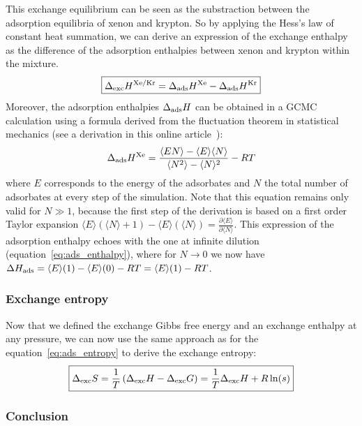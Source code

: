 \documentclass[main.tex]{subfiles}
\begin{document}
This exchange equilibrium can be seen as the substraction between the adsorption equilibria of xenon and krypton. So by applying the Hess's law of constant heat summation, we can derive an expression of the exchange enthalpy as the difference of the adsorption enthalpies between xenon and krypton within the mixture. 
\begin{equation}
  \boxed{
  \Delta_{\text{exc}}H^{\text{Xe/Kr}} = \Delta_{\text{ads}}H^{\text{Xe}} - \Delta_{\text{ads}}H^{\text{Kr}}
  }
\end{equation}
Moreover, the adsorption enthalpies $\Delta_{\text{ads}}H$ can be obtained in a GCMC calculation using a formula derived from the fluctuation theorem in statistical mechanics (see a derivation in this online article~\autocite{github_simon_gcmc}):
\begin{equation}\label{eq:ads_heat_gcmc}
  \Delta_{\text{ads}}H^{\text{Xe}} = \dfrac{\langle EN \rangle - \langle E \rangle\langle N \rangle}{\langle N^2 \rangle - \langle N \rangle^2} - RT
\end{equation}
where $E$ corresponds to the energy of the adsorbates and $N$ the total number of adsorbates at every step of the simulation. Note that this equation remains only valid for $N\gg1$, because the first step of the derivation is based on a first order Taylor expansion $\langle E \rangle(\langle N \rangle+1)-\langle E \rangle(\langle N \rangle) = \frac{\partial \langle E \rangle}{\partial \langle N \rangle}$. This expression of the adsorption enthalpy echoes with the one at infinite dilution (equation~\ref{eq:ads_enthalpy}), where for $N\rightarrow0$ we now have $\Delta H_{\text{ads}} = \langle E \rangle(1)-\langle E \rangle(0) - RT = \langle E \rangle(1) - RT$.

\subsubsection{Exchange entropy}

Now that we defined the exchange Gibbs free energy and an exchange enthalpy at any pressure, we can now use the same approach as for the equation~\ref{eq:ads_entropy} to derive the exchange entropy:
\begin{equation}\label{eq:exc_entropy}
  \boxed{
  \Delta_{\text{exc}}S = \dfrac{1}{T}\left(\Delta_{\text{exc}}H - \Delta_{\text{exc}}G\right)= \dfrac{1}{T}\Delta_{\text{exc}}H + R\ln(s)
  }
\end{equation}

\subsubsection{Conclusion}
\end{document}
